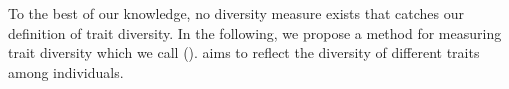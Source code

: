 %

%

To the best of our knowledge, no diversity measure exists that catches our definition of trait diversity.
In the following, we propose a method for measuring trait diversity which we call \emph{\di{}} (\dia{}). 
\dia{} aims to reflect the diversity of different traits among individuals. 
